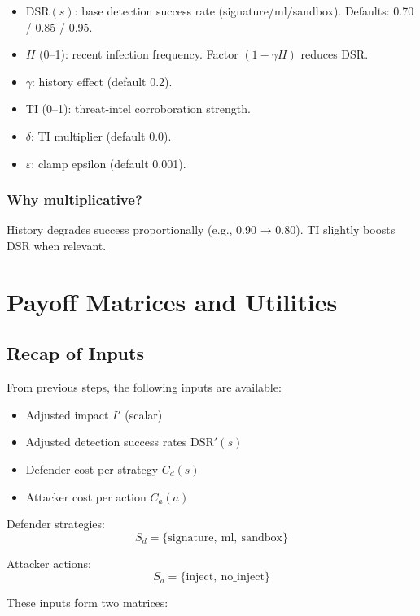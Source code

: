 \documentclass[12pt, a4paper]{report}
\begin{document}
\begin{itemize}
    \item $\mathrm{DSR}(s)$: base detection success rate (signature/ml/sandbox).  
          Defaults: 0.70 / 0.85 / 0.95.
    \item $H$ (0--1): recent infection frequency. Factor $(1-\gamma H)$ reduces DSR.
    \item $\gamma$: history effect (default 0.2).
    \item TI (0--1): threat-intel corroboration strength.
    \item $\delta$: TI multiplier (default 0.0).
    \item $\varepsilon$: clamp epsilon (default 0.001).
\end{itemize}

\subsubsection*{Why multiplicative?}

History degrades success proportionally (e.g., 0.90 → 0.80).  
TI slightly boosts DSR when relevant.



\section{Payoff Matrices and Utilities}

\subsection*{Recap of Inputs}

From previous steps, the following inputs are available:

\begin{itemize}
    \item Adjusted impact $I'$ (scalar)
    \item Adjusted detection success rates $\mathrm{DSR}'(s)$
    \item Defender cost per strategy $C_d(s)$
    \item Attacker cost per action $C_a(a)$
\end{itemize}

Defender strategies:
\[
S_d = \{\text{signature},\ \text{ml},\ \text{sandbox}\}
\]

Attacker actions:
\[
S_a = \{\text{inject},\ \text{no\_inject}\}
\]

These inputs form two matrices:
\end{document}
